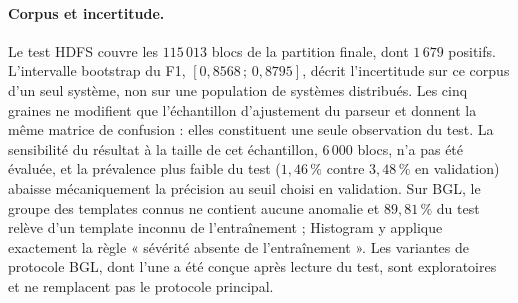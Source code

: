 \paragraph{Corpus et incertitude.}
Le test HDFS couvre les $115\,013$ blocs de la partition finale, dont $1\,679$ positifs.
L'intervalle bootstrap du F1, $[0{,}8568\,;\,0{,}8795]$, décrit l'incertitude sur ce corpus
d'un seul système, non sur une population de systèmes distribués. Les cinq graines ne
modifient que l'échantillon d'ajustement du parseur et donnent la même matrice de
confusion : elles constituent une seule observation du test. La sensibilité du résultat à la
taille de cet échantillon, $6\,000$ blocs, n'a pas été évaluée, et la prévalence plus faible
du test ($1{,}46\,\%$ contre $3{,}48\,\%$ en validation) abaisse mécaniquement la précision
au seuil choisi en validation. Sur BGL, le groupe des templates connus ne contient aucune
anomalie et $89{,}81\,\%$ du test relève d'un template inconnu de l'entraînement ;
Histogram y applique exactement la règle « sévérité absente de l'entraînement ». Les
variantes de protocole BGL, dont l'une a été conçue après lecture du test, sont
exploratoires et ne remplacent pas le protocole principal.

